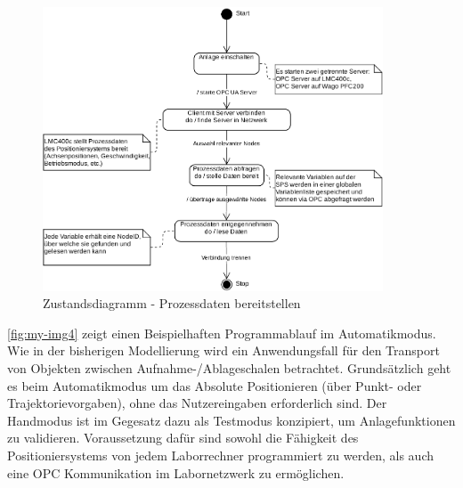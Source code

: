 \documentclass[../../../Bachelorarbeit.tex]{subfiles}
\begin{document}
\begin{figure}[H]
    \centering
    \includegraphics[width=0.9\textwidth]{Images/prozdata_zustand.pdf}
    \caption[Zustandsdiagramm Prozessdaten]{Zustandsdiagramm - Prozessdaten bereitstellen}
    \label{fig:my-img7}
\end{figure}

\autoref{fig:my-img4} zeigt einen Beispielhaften Programmablauf im Automatikmodus. Wie in der bisherigen Modellierung wird ein Anwendungsfall für den Transport von Objekten zwischen Aufnahme-/Ablageschalen betrachtet. Grundsätzlich geht es beim Automatikmodus um das Absolute Positionieren (über Punkt- oder Trajektorievorgaben), ohne das Nutzereingaben erforderlich sind. Der Handmodus ist im Gegesatz dazu als Testmodus konzipiert, um Anlagefunktionen zu validieren. Voraussetzung dafür sind sowohl die Fähigkeit des Positioniersystems von jedem Laborrechner programmiert zu werden, als auch eine OPC Kommunikation im Labornetzwerk zu ermöglichen.
\end{document}
